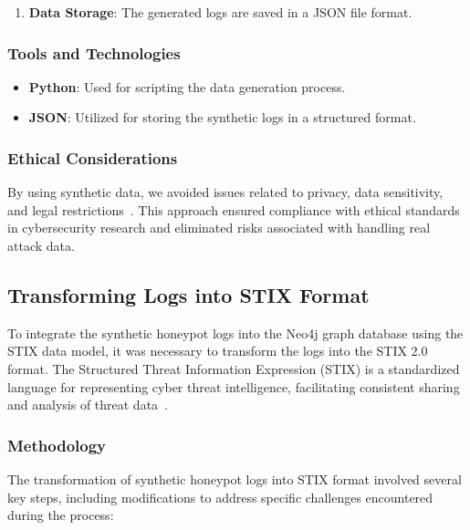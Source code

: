 \documentclass[conference]{IEEEtran}
\begin{document}
\begin{enumerate}
    \item \textbf{Data Storage}: The generated logs are saved in a JSON file format.
\end{enumerate}

\subsubsection{Tools and Technologies}

\begin{itemize}
    \item \textbf{Python}: Used for scripting the data generation process.
    \item \textbf{JSON}: Utilized for storing the synthetic logs in a structured format.
\end{itemize}

\subsubsection{Ethical Considerations}

By using synthetic data, we avoided issues related to privacy, data sensitivity, and legal restrictions~\cite{acm2018ethics}. This approach ensured compliance with ethical standards in cybersecurity research and eliminated risks associated with handling real attack data.




\subsection{Transforming Logs into STIX Format}

To integrate the synthetic honeypot logs into the Neo4j graph database using the STIX data model, it was necessary to transform the logs into the STIX 2.0 format. The Structured Threat Information Expression (STIX) is a standardized language for representing cyber threat intelligence, facilitating consistent sharing and analysis of threat data~\cite{stix2017core}.

\subsubsection{Methodology}

The transformation of synthetic honeypot logs into STIX format involved several key steps, including modifications to address specific challenges encountered during the process:
\end{document}
